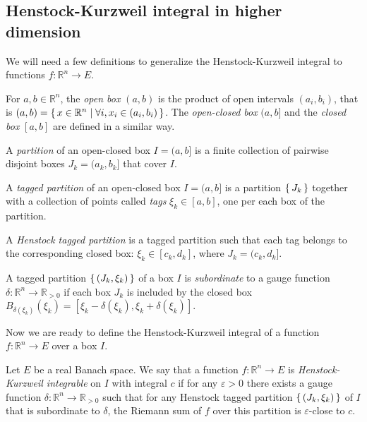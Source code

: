 \documentclass[a4paper, UKenglish,cleveref, autoref, thm-restate]{lipics-v2021}
\newcommand{\bbR}{\mathbb{R}}
\newcommand{\eps}{\varepsilon}
\begin{document}
\subsection{Henstock-Kurzweil integral in higher dimension}%
\label{sec:HK-integral-dim-n}

We will need a few definitions to generalize the Henstock-Kurzweil
integral to functions \(f\colon \bbR^{n}\to E\).

\begin{definition}
  For \(a, b \in \bbR^{n}\), the \emph{open box} \((a, b)\) is the
  product of open intervals \((a_{i}, b_{i})\), that is
  \((a, b)=\set{x\in\bbR^{n}|\forall i, x_{i}\in(a_{i}, b_{i})}\). The
  \emph{open-closed box} \((a, b]\) and the \emph{closed box}
  \([a, b]\) are defined in a similar way.

  A \emph{partition} of an open-closed box \(I=(a, b]\) is a finite
  collection of pairwise disjoint boxes \(J_{k}=(a_{k}, b_{k}]\) that
  cover \(I\).

  A \emph{tagged partition} of an open-closed box \(I=(a, b]\) is a partition
  \(\set{J_{k}}\) together with a collection of points called
  \emph{tags} \(\xi_{k}\in [a, b]\), one per each box of the partition.

  A \emph{Henstock tagged partition} is a tagged partition such that
  each tag belongs to the corresponding closed box:
  \(\xi_{k}\in [c_{k}, d_{k}]\), where \(J_{k}=(c_{k}, d_{k}]\).

  A tagged partition \(\set{(J_{k}, \xi_{k})}\) of a box \(I\) is
  \emph{subordinate} to a gauge function
  \(\delta\colon \bbR^{n}\to\bbR_{>0}\) if each box \(J_{k}\) is
  included by the closed box
  \(B_{\delta(\xi_{k})}(\xi_{k})=[\xi_{k}-\delta(\xi_{k}),
  \xi_{k}+\delta(\xi_{k})]\).
\end{definition}

Now we are ready to define the Henstock-Kurzweil integral of a
function \(f\colon \bbR^{n}\to E\) over a box \(I\).
\begin{definition}
  Let \(E\) be a real Banach space. We say that a function
  \(f\colon \bbR^{n}\to E\) is \emph{Henstock-Kurzweil integrable} on
  \(I\) with integral \(c\) if for any \(\eps>0\) there exists a gauge
  function \(\delta\colon \bbR^{n}\to \bbR_{>0}\) such that for any
  Henstock tagged partition \(\set{(J_{k}, \xi_{k})}\) of \(I\) that
  is subordinate to \(\delta\), the Riemann sum of \(f\) over this
  partition is \(\eps\)-close to \(c\).
\end{definition}
\end{document}
